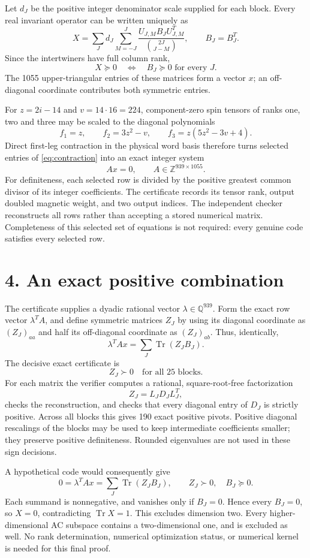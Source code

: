 \documentclass[11pt]{article}
\newcommand{\Tr}{\operatorname{Tr}}
\begin{document}
Let $d_J$ be the positive integer denominator scale supplied for each block. Every real invariant operator can be written uniquely as
\[
 X=\sum_J d_J\sum_{M=-J}^{J}
 \frac{U_{J,M}B_JU_{J,M}^{T}}{\binom{2J}{J-M}},
 \qquad B_J=B_J^T.
\]
Since the intertwiners have full column rank,
\[
 X\succeq0\quad\Longleftrightarrow\quad B_J\succeq0\text{ for every }J.
\]
The 1055 upper-triangular entries of these matrices form a vector $x$; an off-diagonal coordinate contributes both symmetric entries.

For $z=2i-14$ and $v=14\cdot16=224$, component-zero spin tensors of ranks one, two and three may be scaled to the diagonal polynomials
\[
 f_1=z,\qquad f_2=3z^2-v,\qquad
 f_3=z(5z^2-3v+4).
\]
Direct first-leg contraction in the physical word basis therefore turns selected entries of \eqref{eq:contraction} into an exact integer system
\[
 Ax=0,\qquad A\in\mathbb Z^{939\times1055}.
\]
For definiteness, each selected row is divided by the positive greatest common divisor of its integer coefficients. The certificate records its tensor rank, output doubled magnetic weight, and two output indices. The independent checker reconstructs all rows rather than accepting a stored numerical matrix. Completeness of this selected set of equations is not required: every genuine code satisfies every selected row.

\section*{4. An exact positive combination}
The certificate supplies a dyadic rational vector $\lambda\in\mathbb Q^{939}$.
Form the exact row vector $\lambda^TA$, and define symmetric matrices $Z_J$ by using its diagonal coordinate as $(Z_J)_{aa}$ and half its off-diagonal coordinate as $(Z_J)_{ab}$. Thus, identically,
\[
 \lambda^TAx=\sum_J\Tr(Z_JB_J).
\]
The decisive exact certificate is
\[
 \boxed{Z_J\succ0\quad\text{for all 25 blocks}.}
\]
For each matrix the verifier computes a rational, square-root-free factorization
\[
 Z_J=L_JD_JL_J^T,
\]
checks the reconstruction, and checks that every diagonal entry of $D_J$ is strictly positive. Across all blocks this gives 190 exact positive pivots. Positive diagonal rescalings of the blocks may be used to keep intermediate coefficients smaller; they preserve positive definiteness. Rounded eigenvalues are not used in these sign decisions.

A hypothetical code would consequently give
\[
 0=\lambda^TAx=\sum_J\Tr(Z_JB_J),
 \qquad Z_J\succ0,\quad B_J\succeq0.
\]
Each summand is nonnegative, and vanishes only if $B_J=0$. Hence every $B_J=0$, so $X=0$, contradicting $\Tr X=1$.
This excludes dimension two. Every higher-dimensional AC subspace contains a two-dimensional one, and is excluded as well. No rank determination, numerical optimization status, or numerical kernel is needed for this final proof.
\end{document}
